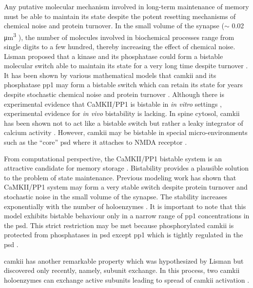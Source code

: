 \documentclass[9pt,lineno,doublespacing]{elife}
\begin{document}
Any putative molecular mechanism involved in long-term maintenance of memory
must be able to maintain its state despite the potent resetting mechanisms of
chemical noise and protein turnover.  In the small volume of the synapse ($\sim$
0.02 \si{\micro\meter^3} \citep{bartol_nanoconnectomic_2015}), the number of
molecules involved in biochemical processes range from single digits to a few
hundred, thereby increasing the effect of chemical noise.  Lisman proposed that
a kinase and its phosphatase could form a bistable molecular switch able to
maintain its state for a very long time despite turnover
\citep{lisman_mechanism_1985}. It has been shown by various mathematical models
that \gls{camkii} and its phosphatase \gls{pp1} may form a bistable switch
\citep{zhabotinsky_bistability_2000} which can retain its
state for years despite stochastic chemical noise and protein turnover
\citep{miller_stability_2005}. Although there is experimental evidence that
CaMKII/PP1 is bistable in \emph{in vitro} settings
\citep{bradshaw_ultrasensitive_2003,urakubo_vitro_2014}, experimental evidence
for \emph{in vivo} bistability is lacking. In spine cytosol, \gls{camkii} has
been shown not to act like a bistable switch but rather a leaky integrator of
calcium activity \citep{chang_camkii_2017}.  However, \gls{camkii} may be
bistable in special micro-environments such as the ``core'' \gls{psd} where it
attaches to NMDA receptor \citep{dosemeci_postsynaptic_2016,
petersen_distribution_2003}.

From computational perspective, the CaMKII/PP1 bistable system is an attractive
candidate for memory storage \citep{koch_biophysics_2004}.  Bistability provides
a plausible solution to the problem of state maintenance. Previous modeling work
has shown that CaMKII/PP1 system may form a very stable switch despite protein
turnover and stochastic noise in the small volume of the synapse.  The stability
increases exponentially with the number of holoenzymes
\citep{miller_stability_2005}. It is important to note that this model exhibits
bistable behaviour only in a narrow range of \gls{pp1} concentrations in the
\gls{psd}. This strict restriction may be met because phosphorylated
\gls{camkii} is protected from phosphatases in \gls{psd} except \gls{pp1}
\citep{strack_differential_1997} which is tightly regulated in the \gls{psd}
\citep{bollen_extended_2010}. 

\gls{camkii} has another remarkable property which was hypothesized by Lisman
\citep{lisman_cam_1994} but discovered only recently, namely, subunit exchange.
In this process, two \gls{camkii} holoenzymes can exchange active subunits
leading to spread of \gls{camkii} activation \citep{stratton_activation-triggered_2014}.
\end{document}
